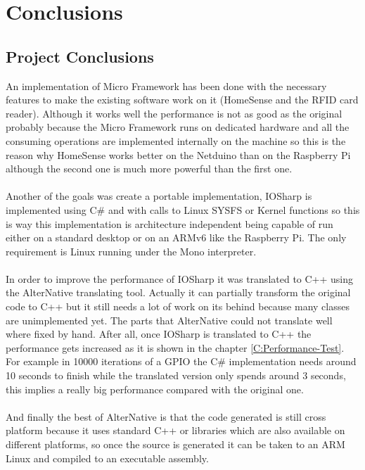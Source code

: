 \chapter{Conclusions}\label{C:Conclusions}
\section{Project Conclusions}\label{S:Project-Conclusions}
An implementation of Micro Framework has been done with the necessary features to make the existing software work on it (HomeSense and the RFID card reader). Although it works well the performance is not as good as the original probably because the Micro Framework runs on dedicated hardware and all the consuming operations are implemented internally on the machine so this is the reason why HomeSense works better on the Netduino than on the Raspberry Pi although the second one is much more powerful than the first one.
\\
\\
Another of the goals was create a portable implementation, IOSharp is implemented using C\# and with calls to Linux SYSFS or Kernel functions so this is way this implementation is architecture independent being capable of run either on a standard desktop or on  an ARMv6 like the Raspberry Pi. The only requirement is Linux running under the Mono interpreter.
\\
\\
In order to improve the performance of IOSharp it was translated to C++ using the AlterNative translating tool. Actually it can partially transform the original code to C++ but it still needs a lot of work on its behind because many classes are unimplemented yet. The parts that AlterNative could not translate well where fixed by hand. After all, once IOSharp is translated to C++ the performance gets increased as it is shown in the chapter \ref{C:Performance-Test}. For example in 10000 iterations of a GPIO the C\# implementation needs around 10 seconds to finish while the translated version only spends around 3 seconds, this implies a really big performance compared with the original one.
\\
\\
And finally the best of AlterNative is that the code generated is still cross platform because it uses standard C++ or libraries which are also available on different platforms, so once the source is generated it can be taken to an ARM Linux and compiled to an executable assembly.

